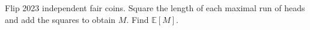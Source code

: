 Flip 2023 independent fair coins. Square the length of each maximal run of heads and add the squares to obtain $M$. Find $\mathbb E[M]$.
